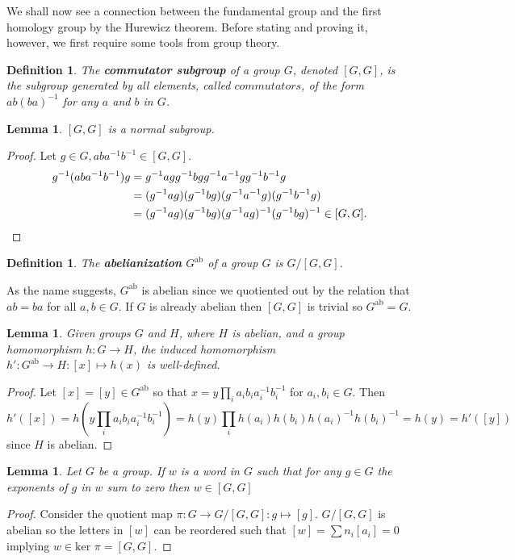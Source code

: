 \documentclass{article}
\newtheorem{definition}[theorem]{Definition}
\newtheorem{lemma}[theorem]{Lemma}
\begin{document}
\noindent We shall now see a connection between the fundamental group and the first homology group by the Hurewicz theorem. Before stating and proving it, however, we first require some tools from group theory.

\begin{definition}
The \textbf{commutator subgroup} of a group $G$, denoted $[G,G]$, is the subgroup generated by all elements, called $commutators$, of the form $ab(ba)^{-1}$ for any $a$ and $b$ in $G$.
\end{definition}

\begin{lemma}
$[G,G]$ is a normal subgroup.
\end{lemma}
\begin{proof}
Let $g\in G,aba^{-1}b^{-1}\in [G,G]$.
\begin{align*}
g^{-1}(aba^{-1}b^{-1})g&=g^{-1}agg^{-1}bgg^{-1}a^{-1}gg^{-1}b^{-1}g\\&=(g^{-1}ag)(g^{-1}bg)(g^{-1}a^{-1}g)(g^{-1}b^{-1}g)\\&=(g^{-1}ag)(g^{-1}bg)(g^{-1}ag)^{-1}(g^{-1}bg)^{-1}\in[G,G].\qedhere
\end{align*}
\end{proof}
\begin{definition}
The \textbf{abelianization} $G^{\text{ab}}$ of a group $G$ is $G/[G,G]$.
\end{definition}
\noindent As the name suggests, $G^{\text{ab}}$ is abelian since we quotiented out by the relation that $ab=ba$ for all $a,b\in G$. If $G$ is already abelian then $[G,G]$ is trivial so $G^{\text{ab}}=G$.

\begin{lemma}
Given groups $G$ and $H$, where $H$ is abelian, and a group homomorphism $h\colon G\to H$, the induced homomorphism $h'\colon G^{\text{ab}}\to H:[x]\mapsto h(x)$ is well-defined.
\end{lemma}
\begin{proof}
Let $[x]=[y]\in G^{\text{ab}}$ so that $x=y\prod_ia_ib_ia_i^{-1}b_i^{-1}$ for $a_i,b_i\in G$.
Then \[h'([x])=h(y\prod_ia_ib_ia_i^{-1}b_i^{-1})=h(y)\prod_ih(a_i)h(b_i)h(a_i)^{-1}h(b_i)^{-1}=h(y)=h'([y])\] since $H$ is abelian.
\end{proof}

\begin{lemma}
Let $G$ be a group. If $w$ is a word in $G$ such that for any $g\in G$ the exponents of $g$ in $w$ sum to zero then $w\in[G,G]$ 
\end{lemma}
\begin{proof}
Consider the quotient map $\pi\colon G\to G/[G,G]:g\mapsto[g]$.
$G/[G,G]$ is abelian so the letters in $[w]$ can be reordered such that $[w]=\sum n_i[a_i]=0$ implying $w\in\text{ker }\pi=[G,G]$. 
\end{proof}
\end{document}

